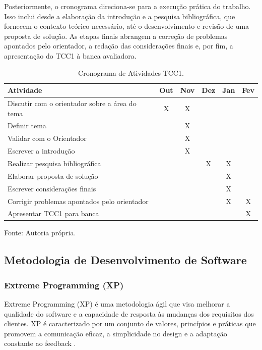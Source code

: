 Posteriormente, o cronograma direciona-se para a execução prática do trabalho. Isso inclui desde a elaboração da introdução e a pesquisa bibliográfica, que fornecem o contexto teórico necessário, até o desenvolvimento e revisão de uma proposta de solução. As etapas finais abrangem a correção de problemas apontados pelo orientador, a redação das considerações finais e, por fim, a apresentação do TCC1 à banca avaliadora.

\begin{table}[h!]
    \centering
    \begin{tabular}{|m{6cm}|c|c|c|c|c|}
        \hline
        \textbf{Atividade} & \textbf{Out} & \textbf{Nov} & \textbf{Dez} & \textbf{Jan} & \textbf{Fev} \\ \hline
        Discutir com o orientador sobre a área do tema & X & X & & & \\ \hline
        Definir tema & & X & & & \\ \hline
        Validar com o Orientador & & X & & & \\ \hline
        Escrever a introdução & & X &  & & \\ \hline
        Realizar pesquisa bibliográfica & & & X & X &  \\ \hline
        Elaborar proposta de solução & & & & X & \\ \hline
        Escrever considerações finais & & & & X &  \\ \hline
        Corrigir problemas apontados pelo orientador & & & & X & X \\ \hline
        Apresentar TCC1 para banca & & & & & X \\ \hline
    \end{tabular}
    \caption{Cronograma de Atividades TCC1.}
    \label{tab:cronograma_tcc1}
    Fonte: Autoria própria.
\end{table}

\subsection{Metodologia de Desenvolvimento de Software}
\label{sec:metodologia_de_desenvolvimento_de_software}

\subsubsection{Extreme Programming (XP)}

Extreme Programming (XP) é uma metodologia ágil que visa melhorar a qualidade do software e a capacidade de resposta às mudanças dos requisitos dos clientes. XP é caracterizado por um conjunto de valores, princípios e práticas que promovem a comunicação eficaz, a simplicidade no design e a adaptação constante ao feedback \cite{beckKent2004}.

